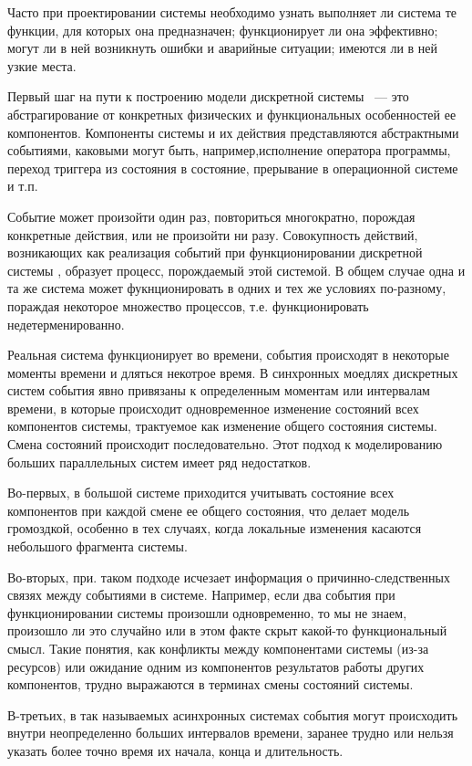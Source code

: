 Часто при проектировании системы необходимо узнать выполняет ли система те функции, для которых она предназначен; функционирует ли она эффективно; могут ли в ней возникнуть ошибки и аварийные ситуации; имеются ли в ней узкие места.

Первый шаг на пути к построению модели дискретной системы ~--- это абстрагирование от конкретных физических и функциональных особенностей ее компонентов. Компоненты системы и их действия представляются абстрактными событиями, каковыми могут быть, например,исполнение оператора программы, переход триггера из состояния в состояние, прерывание в операционной системе и т.п.

Событие может произойти один раз, повториться многократно, порождая конкретные действия, или не произойти ни разу. Совокупность действий, возникающих как реализация событий при функционировании дискретной системы , образует процесс, порождаемый этой системой. В общем случае одна и та же система может фукнционировать в одних и тех же условиях по-разному, пораждая некоторое множество процессов, т.е. функционировать недетерменированно.

Реальная система функционирует во времени, события происходят в некоторые моменты времени и дляться некотрое время. В синхронных моедлях дискретных систем события явно привязаны к определенным моментам или интервалам времени, в которые происходит одновременное изменение состояний всех компонентов системы, трактуемое как изменение общего состояния системы. Смена состояний происходит последовательно. Этот подход к моделированию больших параллельных систем имеет ряд недостатков.

Во-первых, в большой системе приходится учитывать состояние всех компонентов при каждой смене ее общего состояния, что делает модель громоздкой, особенно в тех случаях, когда локальные изменения касаются небольшого фрагмента системы.

Во-вторых, при. таком подходе исчезает информация о причинно-следственных связях между событиями в системе. Например, если два события при функционировании системы произошли одновременно, то мы не знаем, произошло ли это случайно или в этом факте скрыт какой-то функциональный смысл. Такие понятия, как конфликты между компонентами системы (из-за ресурсов) или ожидание одним из компонентов результатов работы других компонентов, трудно выражаются в терминах смены состояний системы.

В-третьих, в так называемых асинхронных системах события могут происходить внутри неопределенно больших интервалов времени, заранее трудно или нельзя указать более точно время их начала, конца и длительность.

